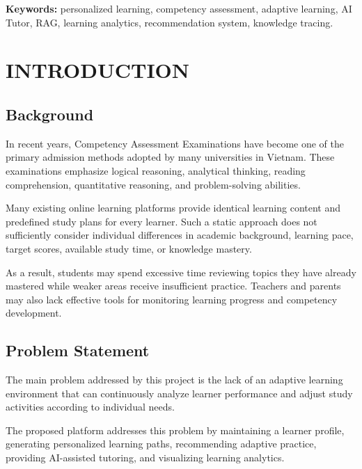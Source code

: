 \documentclass[12pt,a4paper]{report}
\begin{document}
\textbf{Keywords:} personalized learning, competency assessment, adaptive learning, AI Tutor, RAG, learning analytics, recommendation system, knowledge tracing.

\tableofcontents
\listoffigures
\listoftables

\clearpage
{}
\hypersetup{pageanchor=true}

\chapter{INTRODUCTION}

\section{Background}

In recent years, Competency Assessment Examinations have become one of the primary admission methods adopted by many universities in Vietnam. These examinations emphasize logical reasoning, analytical thinking, reading comprehension, quantitative reasoning, and problem-solving abilities.

Many existing online learning platforms provide identical learning content and predefined study plans for every learner. Such a static approach does not sufficiently consider individual differences in academic background, learning pace, target scores, available study time, or knowledge mastery.

As a result, students may spend excessive time reviewing topics they have already mastered while weaker areas receive insufficient practice. Teachers and parents may also lack effective tools for monitoring learning progress and competency development.

\section{Problem Statement}

The main problem addressed by this project is the lack of an adaptive learning environment that can continuously analyze learner performance and adjust study activities according to individual needs.

The proposed platform addresses this problem by maintaining a learner profile, generating personalized learning paths, recommending adaptive practice, providing AI-assisted tutoring, and visualizing learning analytics.
\end{document}
